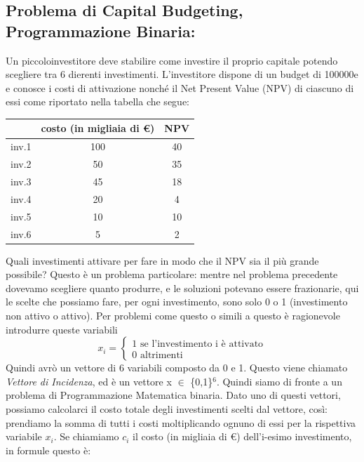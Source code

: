 \subsection{Problema di Capital Budgeting, Programmazione Binaria:} 
Un piccoloinvestitore deve stabilire come investire il proprio capitale potendo
scegliere tra 6 dierenti investimenti. L'investitore dispone di un budget di
100000e e conosce i costi di attivazione nonché il Net Present Value (NPV)
di ciascuno di essi come riportato nella tabella che segue:
\begin{table}[h!]
    \centering
    \begin{tabular}{|c||c|c|}
    \hline
    & costo (in migliaia di \euro) & NPV\\
    \hline
    \hline
    inv.1 & 100 & 40\\
    \hline
    inv.2 & 50 & 35\\
    \hline
    inv.3 & 45 & 18\\
    \hline
    inv.4 & 20 & 4\\
    \hline
    inv.5 & 10 & 10\\
    \hline
    inv.6 & 5 & 2\\
    \hline
    \end{tabular}
\end{table}
Quali investimenti attivare per fare in modo che il NPV sia il più grande possibile? Questo è un problema particolare: mentre nel problema precedente dovevamo scegliere quanto produrre, e le soluzioni potevano essere frazionarie, qui le scelte che possiamo fare, per ogni investimento, sono solo 0 o 1 (investimento non attivo o attivo). Per problemi come questo o simili a questo è ragionevole introdurre queste variabili
\begin{equation*}
    x_i = 
    \begin{cases}
        \text{1 se l'investimento i è attivato}\\
        \text{0 altrimenti}
    \end{cases}
\end{equation*}
Quindi avrò un vettore di 6 variabili composto da 0 e 1. Questo viene chiamato \textit{Vettore di Incidenza}, ed è un vettore x $\in$ \{0,1\}$^6$. Quindi siamo di fronte a un problema di Programmazione Matematica binaria. Dato uno di questi vettori, possiamo calcolarci il costo totale degli investimenti scelti dal vettore, così: prendiamo la somma di tutti i costi moltiplicando ognuno di essi per la rispettiva variabile $x_i$. Se chiamiamo $c_i$ il costo (in migliaia di \euro) dell'i-esimo investimento, in formule questo è:
